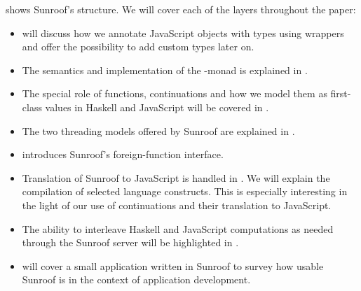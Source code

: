  shows Sunroof's structure.
We will cover each of the layers throughout the paper:
\begin{itemize}
\item
{} will discuss how we annotate 
JavaScript objects with types using wrappers 
and offer the possibility to add custom types later on.
\item
The semantics and implementation of the \JS-monad is explained 
in .
\item
The special role of functions, continuations and
how we model them as first-class values in Haskell and JavaScript
will be covered in .
\item
The two threading models offered by Sunroof are explained 
in .
\item
{} introduces Sunroof's foreign-function interface.
\item
Translation of Sunroof to JavaScript is handled in 
. We will explain the 
compilation of selected language constructs. This is 
especially interesting in the light of our use of continuations
and their translation to JavaScript.
\item
The ability to interleave Haskell and JavaScript computations as needed
through the Sunroof server will be highlighted in .
\item
{} will cover a small application 
written in Sunroof to survey how usable Sunroof is in the 
context of application development. 
\end{itemize}

